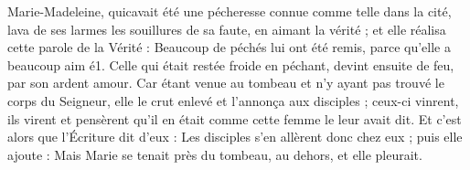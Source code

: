  Marie-Madeleine, quicavait été une pécheresse connue comme telle dans la cité, lava de ses larmes les souillures de sa faute, en aimant la vérité ; et elle réalisa cette parole de la Vérité : Beaucoup de péchés lui ont été remis, parce qu'elle a beaucoup aim é1. Celle qui était restée froide en péchant, devint ensuite de feu, par son ardent amour. Car étant venue au tombeau et n’y ayant pas trouvé le corps du Seigneur, elle le crut enlevé et l’annonça aux disciples ; ceux-ci vinrent, ils virent et pensèrent qu’il en était comme cette femme le leur avait dit. Et c’est alors que l’Écriture dit d’eux : Les disciples s'en allèrent donc chez eux ; puis elle ajoute : Mais Marie se tenait près du tombeau, au dehors, et elle pleurait.